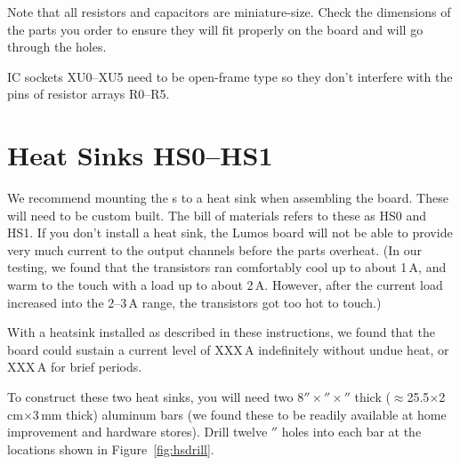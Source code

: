\documentclass[letterpaper,twoside,onecolumn,openright,final]{memoir}
\begin{document}
Note that all resistors and capacitors are miniature-size.  Check the dimensions of the parts
you order to ensure they will fit properly on the board and will go through the holes.

IC sockets XU0--XU5 need to be open-frame type so they don't interfere with the pins of
resistor arrays R0--R5.

\section{Heat Sinks HS0--HS1}
We recommend mounting the s to a heat sink when assembling the board.  These
will need to be custom built.  The bill of materials refers to these as HS0 and HS1.  If you
don't install a heat sink, the Lumos board will not be able to provide very much current to
the output channels before the  parts overheat.  (In our testing, we found that
the transistors ran comfortably cool up to about 1\,A, and warm to the touch with
a load up to about 2\,A.  However, after the current load increased into the 2--3\,A range, 
the transistors got too hot to touch.)

With a heatsink installed as described in these instructions, we found that the board could
sustain a current level of XXX\,A indefinitely without undue heat, or XXX\,A for brief periods.

To construct these two heat sinks, you will need two 
8$''\times$$''\times$$''$ thick ($\approx$25.5$\times$2\,cm$\times$3\,mm thick) 
aluminum bars (we found these to be readily available at home improvement
and hardware stores).  Drill twelve $''$ holes into each bar at the locations shown in 
Figure~\ref{fig:hsdrill}.
\end{document}
